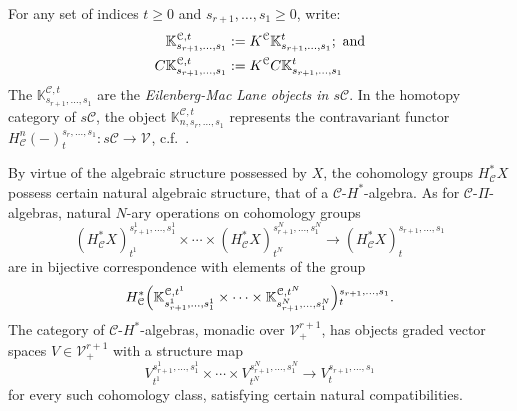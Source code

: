 \documentclass[11pt]{amsart} \renewcommand{\baselinestretch}{1.2}
\theoremstyle{plain}
\theoremstyle{definition}
\newcommand{\DASH}{\mathrm{-}}
\renewcommand{\to}{\longrightarrow}
\newcommand{\calV}{\mathcal{V}}
\newcommand{\calc}{\mathcal{C}}
\newcommand{\vect}[2]{\calV^{#1}_{#2}}
\begin{document}
\begin{Pi-algebras and cohomology algebras}
For any set of indices $t\geq0$ and $s_{r+1},\ldots,s_1\geq0$, write:
\begin{alignat*}{2}
\mathbb{K}^{\calc,t}_{s_{r+1},\ldots,s_1}
&:=
K^\calc \mathbb{K}^{t}_{s_{r+1},\ldots,s_1};\textup{ and}
\\
C\mathbb{K}^{\calc,t}_{s_{r+1},\ldots,s_1}
&:=
K^\calc C\mathbb{K}^{t}_{s_{r+1},\ldots,s_1}%
\end{alignat*}
The $\mathbb{K}^{\calc,t}_{s_{r+1},\ldots,s_1}$ are the \emph{Eilenberg-Mac Lane objects in $s\calc$}. In the homotopy category of $s\calc$, the object $\mathbb{K}^{\calc,t}_{n,s_r,\ldots,s_1}$ represents the contravariant functor $H^n_{\calc}(\DASH)_t^{s_r,\ldots,s_1}:s\calc\to\vect{}{}$,  c.f.\ \cite[Proposition 4.3]{MR1089001}. 




By virtue of the algebraic structure possessed by $X$, the cohomology groups $H_\calc^*X$ possess certain natural algebraic structure, that of a $\calc$-$H^*$-algebra.  As for $\calc$-$\Pi$-algebras, natural $N$-ary operations on cohomology groups
\[(H^*_\calc X)^{s_{r+1}^{1},\ldots,s_{1}^{1}}_{t^1}\times\cdots \times(H^*_\calc X)^{s_{r+1}^{N},\ldots,s_{1}^{N}}_{t^N}\to (H^*_\calc X)^{s_{r+1},\ldots,s_{1}}_{t}\]
are in bijective correspondence with elements of the group
\[ H^*_\calc\Bigl(\mathbb{K}_{s_{r+1}^{1},\ldots,s_{1}^{1}}^{\calc,t^1}\times\cdots\times \mathbb{K}_{s_{r+1}^{N},\ldots,s_{1}^{N}}^{\calc,t^N}\Bigr)\makebox[0cm][l]{}^{s_{r+1},\ldots,s_{1}}_{t}.\]
The category of $\calc$-$H^*$-algebras, monadic over $\vect{r+1}{+}$, has objects graded vector spaces $V\in\vect{r+1}{+}$ with a structure map 
\[V^{s_{r+1}^{1},\ldots,s_{1}^{1}}_{t^1}\times\cdots \times V^{s_{r+1}^{N},\ldots,s_{1}^{N}}_{t^N}\to V^{s_{r+1},\ldots,s_{1}}_{t}\]
for every such cohomology class, satisfying certain natural compatibilities.


\end{Pi-algebras and cohomology algebras}
\end{document}
